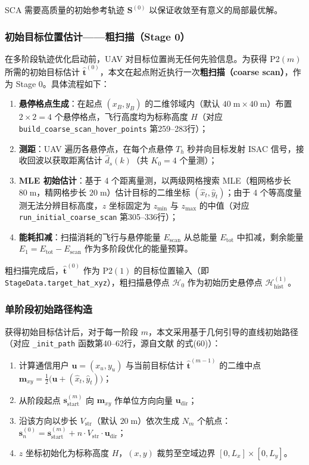 SCA 需要高质量的初始参考轨迹 $\mathbf{S}^{(0)}$ 以保证收敛至有意义的局部最优解。

\subsubsection{初始目标位置估计——粗扫描（Stage 0）}

在多阶段轨迹优化启动前，UAV 对目标位置尚无任何先验信息。为获得 P2$(m)$ 所需的初始目标估计 $\hat{\mathbf{t}}^{(0)}$，本文在起点附近执行一次\textbf{粗扫描（coarse scan）}，作为 Stage 0。具体流程如下：

\begin{enumerate}
    \item \textbf{悬停格点生成}：在起点 $(x_B,y_B)$ 的二维邻域内（默认 $40\;\mathrm{m}\times 40\;\mathrm{m}$）布置 $2\times 2=4$ 个悬停格点，飞行高度均为标称高度 $H$（对应 \texttt{build\_coarse\_scan\_hover\_points} 第259--283行）；
    \item \textbf{测距}：UAV 遍历各悬停点，在每个点悬停 $T_h$ 秒并向目标发射 ISAC 信号，接收回波以获取距离估计 $\widehat{d}_s(k)$（共 $K_0=4$ 个量测）；
    \item \textbf{MLE 初始估计}：基于 4 个距离量测，以两级网格搜索 MLE（粗网格步长 $80\;\mathrm{m}$，精网格步长 $20\;\mathrm{m}$）估计目标的二维坐标 $(\hat{x}_t,\hat{y}_t)$；由于 4 个等高度量测无法分辨目标高度，$z$ 坐标固定为 $z_{\min}$ 与 $z_{\max}$ 的中值（对应 \texttt{run\_initial\_coarse\_scan} 第305--336行）；
    \item \textbf{能耗扣减}：扫描消耗的飞行与悬停能量 $E_{\mathrm{scan}}$ 从总能量 $E_{\mathrm{tot}}$ 中扣减，剩余能量 $E_1=E_{\mathrm{tot}}-E_{\mathrm{scan}}$ 作为多阶段优化的能量预算。
\end{enumerate}

粗扫描完成后，$\hat{\mathbf{t}}^{(0)}$ 作为 P2$(1)$ 的目标位置输入（即 \texttt{StageData.target\_hat\_xyz}），粗扫描悬停点 $\mathcal{H}_0$ 作为初始历史悬停点 $\mathcal{H}_{\mathrm{hist}}^{(1)}$。

\subsubsection{单阶段初始路径构造}

获得初始目标估计后，对于每一阶段 $m$，本文采用基于几何引导的直线初始路径（对应 \texttt{\_init\_path} 函数第40--62行，源自文献\cite{Jing2022} 的式(60)）：

\begin{enumerate}
    \item 计算通信用户 $\mathbf{u}=(x_u,y_u)$ 与当前目标估计 $\hat{\mathbf{t}}^{(m-1)}$ 的二维中点 $\mathbf{m}_{xy}=\frac{1}{2}\bigl(\mathbf{u}+(\hat{x}_t,\hat{y}_t)\bigr)$；
    \item 从阶段起点 $\mathbf{s}_{\mathrm{start}}^{(m)}$ 向 $\mathbf{m}_{xy}$ 作单位方向向量 $\mathbf{u}_{\mathrm{dir}}$；
    \item 沿该方向以步长 $V_{\mathrm{str}}$（默认 $20\;\mathrm{m}$）依次生成 $N_m$ 个航点：$\mathbf{s}_n^{(0)}=\mathbf{s}_{\mathrm{start}}^{(m)}+n\cdot V_{\mathrm{str}}\cdot\mathbf{u}_{\mathrm{dir}}$；
    \item $z$ 坐标初始化为标称高度 $H$，$(x,y)$ 裁剪至空域边界 $[0,L_x]\times[0,L_y]$。
\end{enumerate}


